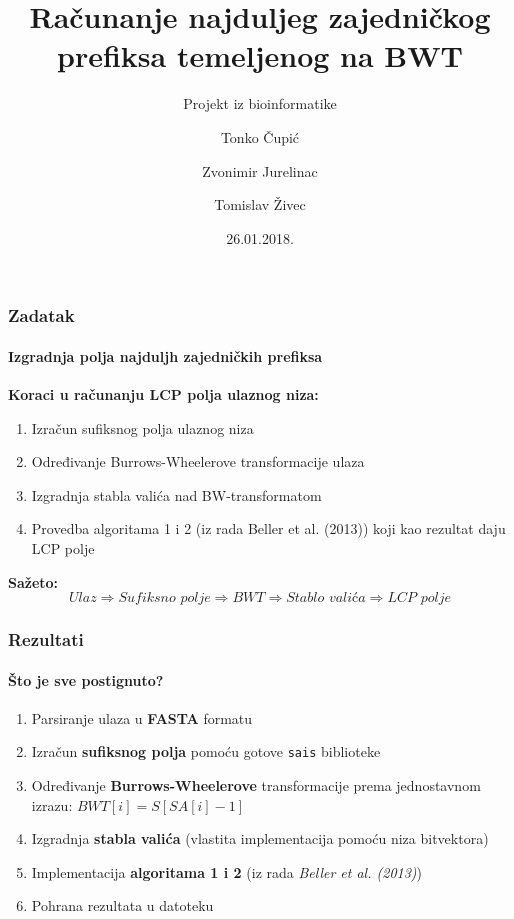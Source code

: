 \documentclass{beamer}
\subtitle{Projekt iz bioinformatike}
\title{Računanje najduljeg zajedničkog prefiksa temeljenog na BWT}
\author[Čupić, Jurelinac, Živec]{Tonko Čupić \and Zvonimir Jurelinac \and Tomislav Živec}
\institute{Fakultet elektrotehnike i računarstva}
\date{26.01.2018.}
\begin{document}
    \frame{\titlepage}

    \begin{frame}
        \frametitle{Zadatak}
        \framesubtitle{Izgradnja polja najduljh zajedničkih prefiksa}

        \textbf{Koraci u računanju LCP polja ulaznog niza:}
        \begin{enumerate}
            \item Izračun sufiksnog polja ulaznog niza
            \item Određivanje Burrows-Wheelerove transformacije ulaza
            \item Izgradnja stabla valića nad BW-transformatom
            \item Provedba algoritama 1 i 2 (iz rada Beller et al. (2013)) koji kao rezultat daju LCP polje
        \end{enumerate}

        \vspace{1cm}

        \textbf{Sažeto:}
        $$\textit{Ulaz} \Rightarrow \textit{Sufiksno polje} \Rightarrow \textit{BWT} \Rightarrow \textit{Stablo valića} \Rightarrow \textit{LCP polje}$$

    \end{frame}

    \begin{frame}
        \frametitle{Rezultati}
        \framesubtitle{Što je sve postignuto?}

        \begin{enumerate}
            \item Parsiranje ulaza u \textbf{FASTA} formatu
            \item Izračun \textbf{sufiksnog polja} pomoću gotove \texttt{sais} biblioteke
            \item Određivanje \textbf{Burrows-Wheelerove} transformacije prema jednostavnom izrazu: $BWT[i] =S[SA[i]-1]$
            \item Izgradnja \textbf{stabla valića} (vlastita implementacija pomoću niza bitvektora)
            \item Implementacija \textbf{algoritama 1 i 2} (iz rada \textit{Beller et al. (2013)})
            \item Pohrana rezultata u datoteku
        \end{enumerate}
    \end{frame}
\end{document}

